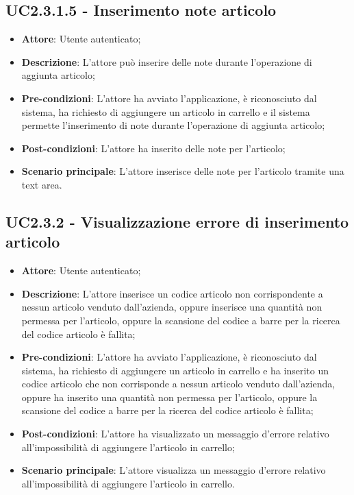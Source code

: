 \subsection{UC2.3.1.5 - Inserimento note articolo}

\begin{itemize}
	\item \textbf{Attore}: Utente autenticato;
	\item \textbf{Descrizione}: L'attore può inserire delle note durante l'operazione di aggiunta articolo;
	\item \textbf{Pre-condizioni}: L'attore ha avviato l'applicazione, è riconosciuto dal sistema, ha richiesto di aggiungere un articolo in carrello e il sistema permette l'inserimento di note durante l'operazione di aggiunta articolo;
	\item \textbf{Post-condizioni}: L'attore ha inserito delle note per l'articolo;
	\item \textbf{Scenario principale}: L'attore inserisce delle note per l'articolo tramite una text area.
\end{itemize}

\subsection{UC2.3.2 - Visualizzazione errore di inserimento articolo}

\begin{itemize}
	\item \textbf{Attore}: Utente autenticato;
	\item \textbf{Descrizione}: L'attore inserisce un codice articolo non corrispondente a nessun articolo venduto dall'azienda, oppure inserisce una quantità non permessa per l'articolo, oppure la scansione del codice a barre per la ricerca del codice articolo è fallita;
	\item \textbf{Pre-condizioni}: L'attore ha avviato l'applicazione, è riconosciuto dal sistema, ha richiesto di aggiungere un articolo in carrello e ha inserito un codice articolo che non corrisponde a nessun articolo venduto dall'azienda, oppure ha inserito una quantità non permessa per l'articolo, oppure la scansione del codice a barre per la ricerca del codice articolo è fallita;
	\item \textbf{Post-condizioni}: L'attore ha visualizzato un messaggio d'errore relativo all'impossibilità di aggiungere l'articolo in carrello;
	\item \textbf{Scenario principale}: L'attore visualizza un messaggio d'errore relativo all'impossibilità di aggiungere l'articolo in carrello.
\end{itemize}

